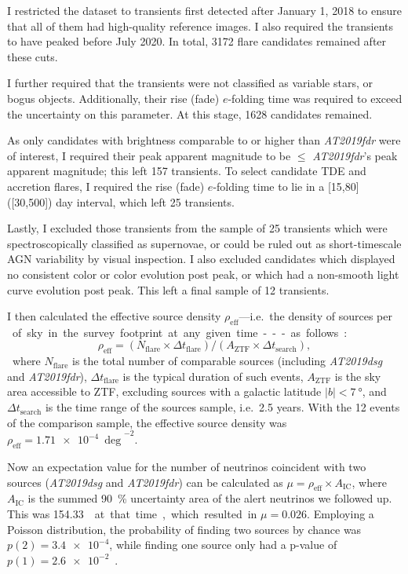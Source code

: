 I restricted the dataset to transients first detected after January 1, 2018 to ensure that all of them had high-quality reference images. I also required the transients to have peaked before July 2020. In total, 3172 flare candidates remained after these cuts.

I further required that the transients were not classified as variable stars, or bogus objects. Additionally, their rise (fade) $e$-folding time was required to exceed the uncertainty on this parameter. At this stage, 1628 candidates remained.

As only candidates with brightness comparable to or higher than \emph{AT2019fdr} were of interest, I required their peak apparent magnitude to be $\leq$ \emph{AT2019fdr}'s peak apparent magnitude; this left 157 transients. To select candidate TDE and accretion flares, I required the rise (fade) $e$-folding time to lie in a [15,80] ([30,500]) day interval, which left 25 transients.

Lastly, I excluded those transients from the sample of 25 transients which were spectroscopically classified as supernovae, or could be ruled out as short-timescale AGN variability by visual inspection. I also excluded candidates which displayed no consistent color or color evolution post peak, or which had a non-smooth light curve evolution post peak. This left a final sample of 12 transients.

I then calculated the effective source density $\rho_\text{eff}$---i.e.\ the density of sources per \unit{\square\deg} of sky in the survey footprint at any given time---as follows:

\begin{equation}
    \rho_\text{eff} = (N_\text{flare} \times \Delta t_\text{flare}) / (A_\text{ZTF}  \times \Delta t_\text{search}),
\end{equation}
where $N_\text{flare}$ is the total number of comparable sources (including \emph{AT2019dsg} and \emph{AT2019fdr}), $\Delta t_\text{flare}$ is the typical duration of such events, $A_\text{ZTF}$ is the sky area accessible to ZTF, excluding sources with a galactic latitude $|b|<\SI{7}{\degree}$, and $\Delta t_\text{search}$ is the time range of the sources sample, i.e.\ 2.5 years. With the 12 events of the comparison sample, the effective source density was $\rho_\text{eff} = \SI{1.71e-4}{\deg}^{-2}$.

Now an expectation value for the number of neutrinos coincident with two sources (\textit{AT2019dsg} and \textit{AT2019fdr}) can be calculated as $\mu=\rho_\text{eff}\times A_\text{IC}$, where $A_\text{IC}$ is the summed \SI{90}{\percent} uncertainty area of the alert neutrinos we followed up. This was \SI{154.33}{\square\deg} at that time, which resulted in $\mu=0.026$. Employing a Poisson distribution, the probability of finding two sources by chance was $p(2)=\num{3.4e-4}$, while finding one source only had a p-value of $p(1)=\num{2.6e-2}$~\cite{Reusch2022}.

